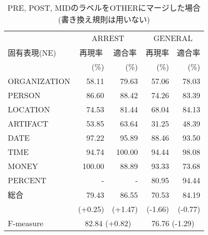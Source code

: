 {\begin{table*}[htbp]
  \begin{center}
    \caption{PRE, POST, MIDのラベルをOTHERにマージした場合
      (書き換え規則は用いない)}
    \label{Comparison1} 
    \begin{tabular}{|l|r@{ }r|r@{ }r|}
      \hline
      & \multicolumn{2}{c|}{ARREST} 
      & \multicolumn{2}{c|}{GENERAL}\\
      \cline{2-5}
      固有表現(NE) & \multicolumn{1}{c}{再現率} 
      & \multicolumn{1}{c|}{適合率} & \multicolumn{1}{c}{再現率} 
      & \multicolumn{1}{c|}{適合率} \\
      & (\%) & (\%) & (\%) & (\%) \\
      \hline      
      ORGANIZATION &  58.11 &  79.63 &  57.06 &  78.03 \\
      PERSON       &  86.60 &  88.42 &  74.26 &  83.39 \\
      LOCATION     &  74.53 &  81.44 &  68.04 &  84.13 \\
      ARTIFACT     &  53.85 &  63.64 &  31.25 &  48.39 \\
      DATE         &  97.22 &  95.89 &  88.46 &  93.50 \\
      TIME         &  94.74 & 100.00 &  94.44 &  98.08 \\
      MONEY        & 100.00 &  88.89 &  93.33 &  73.68 \\
      PERCENT      &      - &      - &  80.95 &  94.44 \\
      \hline
      総合 & 79.43 & 86.55 & 70.53 & 84.19 \\
      & (+0.25) & (+1.47) & (-1.66) & (-0.77) \\
      \hline
      \hline
      F-measure & \multicolumn{2}{c|}{82.84 (+0.82)} 
      & \multicolumn{2}{c|}{76.76 (-1.29)} \\
      \hline
    \end{tabular}
  \end{center}


\end{table*}}
